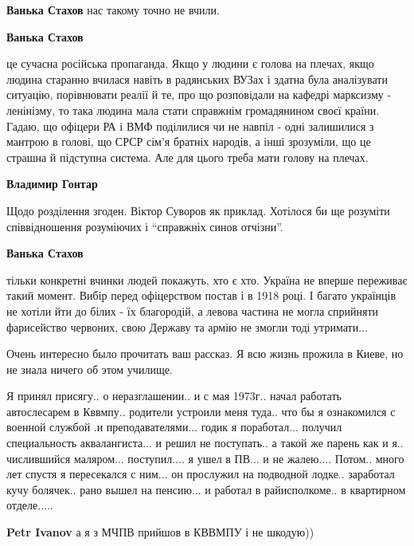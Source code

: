\begin{itemize}
\begin{itemize} %
\textbf{Ванька Стахов} нас такому точно не вчили.

\textbf{Ванька Стахов} 

це сучасна російська пропаганда. Якщо у людини є голова на плечах, якщо людина
старанно вчилася навіть в радянських ВУЗах і здатна була аналізувати ситуацію,
порівнювати реалії й те, про що розповідали на кафедрі марксизму - ленінізму,
то така людина мала стати справжнім громадянином своєї країни. Гадаю, що
офіцери РА і ВМФ поділилися чи не навпіл - одні залишилися з мантрою в голові,
що СРСР сім’я братніх народів, а інші зрозуміли, що це страшна й підступна
система. Але для цього треба мати голову на плечах.

\begin{itemize} %
\textbf{Владимир Гонтар} 

Щодо розділення згоден. Віктор Суворов як приклад. Хотілося би ще розуміти
співвідношення розуміючих і \enquote{справжніх синов отчізни}.


\textbf{Ванька Стахов} 

тільки конкретні вчинки людей покажуть, хто є хто. Україна не вперше переживає
такий момент. Вибір перед офіцерством постав і в 1918 році. І багато українців
не хотіли йти до білих - їх благородій, а левова частина не могла сприйняти
фарисейство червоних, свою Державу та армію не змогли тоді утримати...

\end{itemize} %

\end{itemize} %

Очень интересно было прочитать ваш рассказ. Я всю жизнь прожила в Киеве, но не
знала ничего об этом училище.



Я принял присягу.. о неразглашении.. и с мая 1973г.. начал работать автослесарем в
Кввмпу.. родители устроили меня туда.. что бы я ознакомился с военной службой .и
преподавателями... годик я поработал... получил специальность аквалангиста... и
решил не поступать.. а такой же парень как и я.. числившийся
маляром... поступил.... я ушел в ПВ... и не жалею.... Потом.. много лет спустя я
пересекался с ним... он прослужил на подводной лодке.. заработал кучу
болячек.. рано вышел на пенсию... и работал в райисполкоме.. в квартирном
отделе.....

\begin{itemize} %
\textbf{Petr Ivanov} а я з МЧПВ прийшов в КВВМПУ і не шкодую))


\end{itemize}
\end{itemize}
